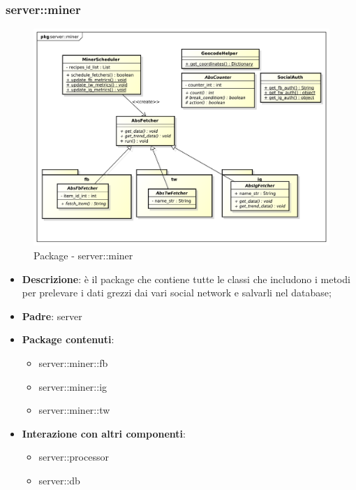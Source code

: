 


\subsubsection{server::miner} %
\label{ssub:bdsm_app_server_miner}
\begin{figure}[htbp]
	\centering
	\centerline{\includegraphics[scale=0.5]{./images/server/miner.pdf}}
	\caption{Package - server::miner}
\end{figure}

\begin{itemize}
  \item \textbf{Descrizione}: è il package che contiene tutte le classi che includono i metodi per prelevare i dati grezzi dai vari social network e salvarli nel database;
  \item \textbf{Padre}: server
  \item \textbf{Package contenuti}:
  	\begin{itemize}
  		\item server::miner::fb
  		\item server::miner::ig
  		\item server::miner::tw
  	\end{itemize}
  \item \textbf{Interazione con altri componenti}:
  	\begin{itemize}
  		\item server::processor
  		\item server::db
  	\end{itemize}
\end{itemize}

